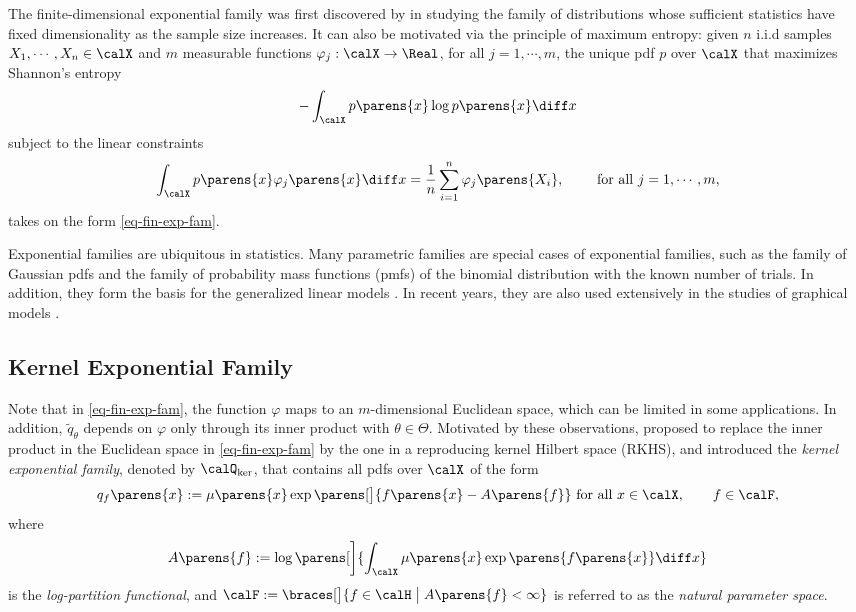 \documentclass[12pt]{article}
\theoremstyle{definition}
\theoremstyle{theorem}
\theoremstyle{remark}
\begin{document}
The finite-dimensional exponential family was first discovered by \textcite{Darmois1935-yz, Koopman1936-fb, Pitman1936-cl} in studying the family of distributions whose sufficient statistics have fixed dimensionality as the sample size increases. It can also be motivated via the principle of maximum entropy: given $n$ i.i.d samples $X_1, \cdots, X_n \in \calX$ and $m$ measurable functions $\varphi_j: \calX \to \Real$, for all $j = 1, \cdots, m$, the unique pdf $p$ over $\calX$ that maximizes Shannon's entropy 
\begin{align}
	- \int_{\calX} p \parens{x} \log p \parens{x} \diff x 
\end{align}
subject to the linear constraints 
\begin{align}
	\int_{\calX} p \parens{x} \varphi_j \parens{x} \diff x = \frac{1}{n} \sum_{i=1}^n \varphi_j \parens{X_i}, \qquad \text{ for all } j = 1, \cdots, m, 
\end{align}
takes on the form \eqref{eq-fin-exp-fam}. 

Exponential families are ubiquitous in statistics. Many parametric families are special cases of exponential families, such as the family of Gaussian pdfs and the family of probability mass functions (pmfs) of the binomial distribution with the known number of trials. In addition, they form the basis for the generalized linear models \parencite{mccullagh1989generalized}. In recent years, they are also used extensively in the studies of graphical models \parencite{Wainwright2008-tp}. 

\subsection{Kernel Exponential Family}

Note that in \eqref{eq-fin-exp-fam}, the function $\varphi$ maps to an $m$-dimensional Euclidean space, which can be limited in some applications. In addition, $\tilde{q}_{\theta}$ depends on $\varphi$ only through its inner product with $\theta \in \Theta$. Motivated by these observations, \textcite{Canu2006-ig} proposed to replace the inner product in the Euclidean space in \eqref{eq-fin-exp-fam} by the one in a reproducing kernel Hilbert space (RKHS), and introduced the \textit{kernel exponential family}, denoted by $\calQ_{\ker}$, that contains all pdfs over $\calX$ of the form 
\begin{align}\label{eq-kernel-exp-fam}
	q_f \parens{x} := \mu \parens{x} \exp \parens[\big]{ f \parens{x} - A \parens{f}} \text{ for all } x \in \calX, \qquad f \in \calF,  
\end{align}
where 
\begin{align}\label{eq-log-partition-fun-kerexpfam}
	A \parens{f} := \log \parens[\bigg]{\int_{\calX} \mu \parens{x} \exp \parens{ f \parens{x} } \diff x}
\end{align}
is the \textit{log-partition functional}, and $\calF := \braces[\big]{f \in \calH \bigm| A \parens{f} < \infty}$ is referred to as the \textit{natural parameter space}. 
\end{document}
